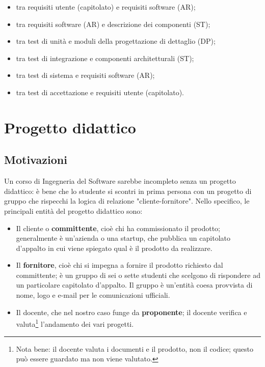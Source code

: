 \documentclass[a4paper]{article}
\begin{document}
	\begin{itemize}
		
			
	\item tra requisiti utente (capitolato) e requisiti software (AR);
			
	\item tra requisiti software (AR) e descrizione dei componenti (ST);
			
	\item tra test di unità e moduli della progettazione di dettaglio (DP);
			
	\item tra test di integrazione e componenti architetturali (ST);
			
	\item tra test di sistema e requisiti software (AR);
			
	\item tra test di accettazione e requisiti utente (capitolato).
		
	\end{itemize}

	


		
	\section{Progetto didattico}


		
	\subsection{Motivazioni}

		
Un corso di Ingegneria del Software sarebbe incompleto senza un progetto didattico: è bene che lo studente si scontri in prima persona con un progetto di gruppo che rispecchi la logica di relazione "cliente-fornitore". Nello specifico, le principali entità del progetto didattico sono:
		
	\begin{itemize}
		
			
	\item Il cliente o \textbf{committente}, cioè chi ha commissionato il prodotto; generalmente è un'azienda o una startup, che pubblica un capitolato d'appalto in cui viene spiegato qual è il prodotto da realizzare.
			
	\item Il \textbf{fornitore}, cioè chi si impegna a fornire il prodotto richiesto dal committente; è un gruppo di sei o sette studenti che scelgono di rispondere ad un particolare capitolato d'appalto. Il gruppo è un'entità coesa provvista di nome, logo e e-mail per le comunicazioni ufficiali.
			
	\item Il docente, che nel nostro caso funge da \textbf{proponente}; il docente verifica e valuta\footnote{Nota bene: il docente valuta i documenti e il prodotto, non il codice; questo può essere guardato ma non viene valutato.} l'andamento dei vari progetti.
		
	\end{itemize}
\end{document}
